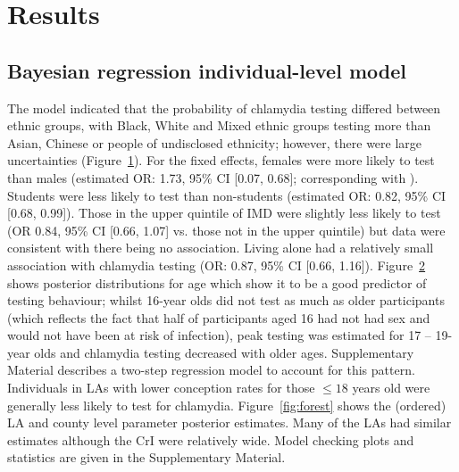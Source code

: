 \documentclass[fleqn,10pt]{wlscirep}
\begin{document}
\section*{Results}

\subsection*{Bayesian regression individual-level model}
The model indicated that the probability of chlamydia testing differed between ethnic groups, with Black, White and Mixed ethnic groups testing more than Asian, Chinese or people of undisclosed ethnicity; however, there were large uncertainties (Figure~\ref{fig:tornado}). For the fixed effects, females were more likely to test than males (estimated OR: 1.73, 95\% CI [0.07, 0.68]; corresponding with \cite{Sonnenberg2013}). Students were less likely to test than non-students (estimated OR: 0.82, 95\% CI [0.68, 0.99]). Those in the upper quintile of IMD were slightly less likely to test (OR 0.84, 95\% CI [0.66, 1.07] vs. those not in the upper quintile) but data were consistent with there being no association. Living alone had a relatively small association with chlamydia testing (OR: 0.87, 95\% CI [0.66, 1.16]). Figure~\ref{fig:ridge} shows posterior distributions for age which show it to be a good predictor of testing behaviour; whilst 16-year olds did not test as much as older participants (which reflects the fact that half of participants aged 16 had not had sex and would not have been at risk of infection), peak testing was estimated for 17 – 19-year olds and chlamydia testing decreased with older ages. Supplementary Material describes a two-step regression model to account for this pattern. Individuals in LAs with lower conception rates for those $\leq 18$ years old were generally less likely to test for chlamydia. Figure~\ref{fig:forest} shows the (ordered) LA and county level parameter posterior estimates. Many of the LAs had similar estimates although the CrI were relatively wide. Model checking plots and statistics are given in the Supplementary Material.

\begin{figure}[!ht]
\centering
\caption{}
\label{fig:tornado}
\end{figure}

\begin{figure}[!ht]
\centering
\caption{}
\label{fig:ridge}
\end{figure}
\end{document}
